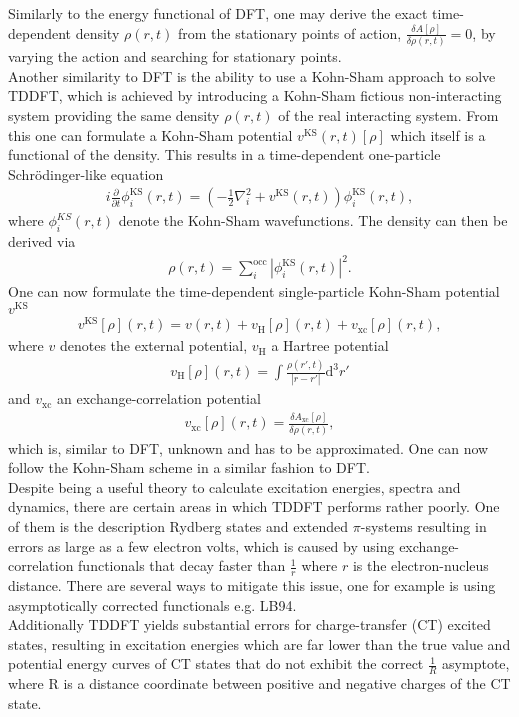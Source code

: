 Similarly to the energy functional of DFT, one may derive the exact time-dependent density $\rho(r, t)$ from the stationary points of action, $ \frac{\delta A[\rho]}{\delta \rho(r, t)} = 0$, by varying the action and searching for stationary points.\\
Another similarity to DFT is the ability to use a Kohn-Sham approach to solve TDDFT, which is achieved by introducing a  Kohn-Sham fictious non-interacting system providing the same density $\rho(r, t)$ of the real interacting system. From this one can formulate a Kohn-Sham potential $v^{\mathrm{KS}}(r, t)[\rho]$ which itself is a functional of the density. This results in a time-dependent one-particle Schrödinger-like equation 
\begin{align}
    i\frac{\partial}{\partial t}\phi_i^{\mathrm{KS}}(r, t) = \left(-\frac{1}{2}\nabla_{i}^{2}+v^{\mathrm{KS}}(r, t)\right)\phi_i^{\mathrm{KS}}(r, t),
\end{align}
where $\phi_i^{KS}(r, t)$ denote the Kohn-Sham wavefunctions. The density can then be derived via
\begin{align}
    \rho(r, t) = \sum_{i}^{\mathrm{occ}} |\phi_i^{\mathrm{KS}}(r, t)|^{2}.
\end{align}
One can now formulate the time-dependent single-particle Kohn-Sham potential $v^{\mathrm{KS}}$
\begin{align}
    v^{\mathrm{KS}}[\rho](r, t) = v(r, t) + v_{\mathrm{H}}[\rho](r, t) + v_{\mathrm{xc}}[\rho](r, t)\mathrm{,}
\end{align}
where $v$ denotes the external potential, $v_{\mathrm{H}}$ a Hartree potential
\begin{align}
    v_{\mathrm{H}}[\rho](r, t) = \int \frac{\rho(r', t)}{|r-r'|}\mathrm{d}^3 r'
\end{align}
and $v_{\mathrm{xc}}$ an exchange-correlation potential
\begin{align}
    v_{\mathrm{xc}}[\rho](r, t) = \frac{\delta A_{\mathrm{xc}}[\rho]}{\delta \rho (r, t)}\mathrm{,}
\end{align}
which is, similar to DFT, unknown and has to be approximated.\cite{TDDFT} One can now follow the Kohn-Sham scheme in a similar fashion to DFT.\\
Despite being a useful theory to calculate excitation energies, spectra and dynamics, there are certain areas in which TDDFT performs rather poorly. One of them is the description Rydberg states and extended $\pi$-systems resulting in errors as large as a few electron volts,\cite{DFT_pi_error_1, DFT_pi_error_2} which is caused by using exchange-correlation functionals that decay faster than $\frac{1}{r}$ where $r$ is the electron-nucleus distance. There are several ways to mitigate this issue, one for example is using asymptotically corrected functionals e.g. LB94.\cite{DFT_pi_corr_1} \\
Additionally TDDFT yields substantial errors for charge-transfer (CT) excited states, resulting in excitation energies which are far lower than the true value and potential energy curves of CT states that do not exhibit the correct $\frac{1}{R}$ asymptote, where R is a distance coordinate between positive and negative charges of the CT state.\cite{DFT_CT_error_1, DFT_CT_error_2}


